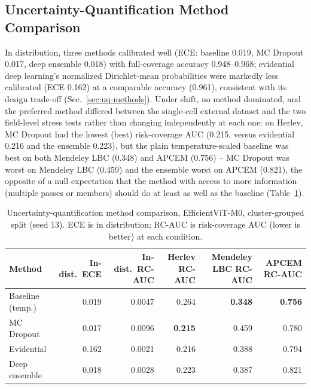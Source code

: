 \documentclass[12pt,letterpaper]{article}
\begin{document}
\subsection{Uncertainty-Quantification Method Comparison}
\label{sec:uq-results}
In distribution, three methods calibrated well (ECE: baseline 0.019, MC Dropout 0.017, deep ensemble 0.018) with full-coverage accuracy 0.948--0.968; evidential deep learning's normalized Dirichlet-mean probabilities were markedly less calibrated (ECE 0.162) at a comparable accuracy (0.961), consistent with its design trade-off (Sec.~\ref{sec:uq-methods}). Under shift, no method dominated, and the preferred method differed between the single-cell external dataset and the two field-level stress tests rather than changing independently at each one: on Herlev, MC Dropout had the lowest (best) risk-coverage AUC (0.215, versus evidential 0.216 and the ensemble 0.223), but the plain temperature-scaled baseline was best on both Mendeley LBC (0.348) and APCEM (0.756) -- MC Dropout was worst on Mendeley LBC (0.459) and the ensemble worst on APCEM (0.821), the opposite of a null expectation that the method with access to more information (multiple passes or members) should do at least as well as the baseline (Table~\ref{tab:uq}).

\begin{table}[htbp]
\centering
\caption{Uncertainty-quantification method comparison, EfficientViT-M0, cluster-grouped split (seed 13). ECE is in distribution; RC-AUC is risk-coverage AUC (lower is better) at each condition.}
\label{tab:uq}
\small
\begin{tabular}{lrrrrr}
\toprule
Method & In-dist.\ ECE & In-dist.\ RC-AUC & Herlev RC-AUC & Mendeley LBC RC-AUC & APCEM RC-AUC \\
\midrule
Baseline (temp.) & 0.019 & 0.0047 & 0.264 & \textbf{0.348} & \textbf{0.756} \\
MC Dropout & 0.017 & 0.0096 & \textbf{0.215} & 0.459 & 0.780 \\
Evidential & 0.162 & 0.0021 & 0.216 & 0.388 & 0.794 \\
Deep ensemble & 0.018 & 0.0028 & 0.223 & 0.387 & 0.821 \\
\bottomrule
\end{tabular}
\end{table}
\end{document}

